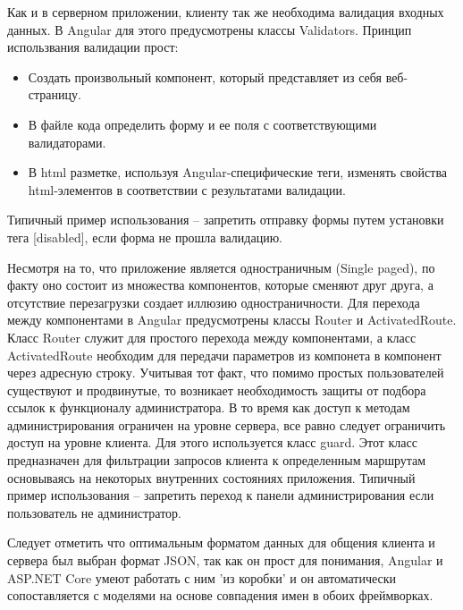 Как и в серверном приложении, клиенту так же необходима валидация входных данных. В Angular для этого предусмотрены классы Validators. Принцип использвания валидации прост: 
\begin{itemize}
	\item Создать произвольный компонент, который представляет из себя веб-страницу.
	\item В файле кода определить форму и ее поля с соответствующими валидаторами.
	\item В html разметке, используя Angular-специфические теги, изменять свойства html-элементов в соответствии с результатами валидации.
\end{itemize} 
Типичный пример использования -- запретить отправку формы путем установки тега [disabled], если форма не прошла валидацию.

Несмотря на то, что приложение является одностраничным (Single paged), по факту оно состоит из множества компонентов, которые сменяют друг друга, а отсутствие перезагрузки создает иллюзию одностраничности.
Для перехода между компонентами в Angular предусмотрены классы Router и ActivatedRoute. Класс Router служит для простого перехода между компонентами, а класс ActivatedRoute необходим для передачи параметров 
из компонета в компонент через адресную строку. Учитывая тот факт, что помимо простых пользователей существуют и продвинутые, то возникает необходимость защиты от подбора ссылок к функционалу администратора.
В то время как доступ к методам администрирования ограничен на уровне сервера, все равно следует ограничить доступ на уровне клиента. Для этого используется класс guard.
Этот класс предназначен для фильтрации запросов клиента к определенным маршрутам основываясь на некоторых внутренних состояниях приложения. Типичный пример использования -- запретить переход к панели администрирования
если пользователь не администратор.

Следует отметить что оптимальным форматом данных для общения клиента и сервера был выбран формат JSON, так как он прост для понимания, Angular и ASP.NET Core умеют работать с ним 'из коробки' 
и он автоматически сопоставляется с моделями на основе совпадения имен в обоих фреймворках.






